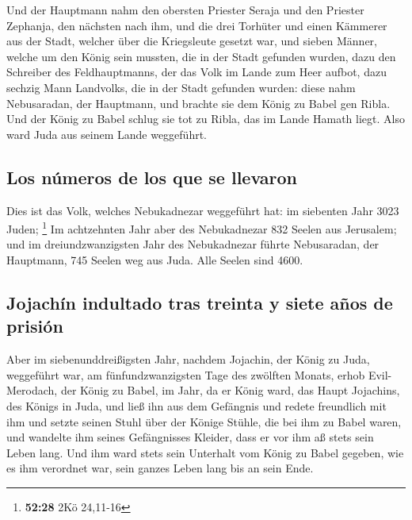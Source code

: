  Und der Hauptmann nahm den obersten Priester Seraja und
den Priester Zephanja, den nächsten nach ihm, und die drei Torhüter
 und einen Kämmerer aus der Stadt, welcher über die
Kriegsleute gesetzt war, und sieben Männer, welche um den König sein
mussten, die in der Stadt gefunden wurden, dazu den Schreiber des
Feldhauptmanns, der das Volk im Lande zum Heer aufbot, dazu sechzig Mann
Landvolks, die in der Stadt gefunden wurden:  diese nahm
Nebusaradan, der Hauptmann, und brachte sie dem König zu Babel gen
Ribla.  Und der König zu Babel schlug sie tot zu Ribla,
das im Lande Hamath liegt. Also ward Juda aus seinem Lande weggeführt.

\hypertarget{los-nuxfameros-de-los-que-se-llevaron}{%
\subsection{Los números de los que se
llevaron}\label{los-nuxfameros-de-los-que-se-llevaron}}

 Dies ist das Volk, welches Nebukadnezar weggeführt hat:
im siebenten Jahr 3023 Juden; \footnote{\textbf{52:28} 2Kö 24,11-16}
 Im achtzehnten Jahr aber des Nebukadnezar 832 Seelen aus
Jerusalem;  und im dreiundzwanzigsten Jahr des
Nebukadnezar führte Nebusaradan, der Hauptmann, 745 Seelen weg aus Juda.
Alle Seelen sind 4600.

\hypertarget{jojachuxedn-indultado-tras-treinta-y-siete-auxf1os-de-prisiuxf3n}{%
\subsection{Jojachín indultado tras treinta y siete años de
prisión}\label{jojachuxedn-indultado-tras-treinta-y-siete-auxf1os-de-prisiuxf3n}}

 Aber im siebenunddreißigsten Jahr, nachdem Jojachin, der
König zu Juda, weggeführt war, am fünfundzwanzigsten Tage des zwölften
Monats, erhob Evil-Merodach, der König zu Babel, im Jahr, da er König
ward, das Haupt Jojachins, des Königs in Juda, und ließ ihn aus dem
Gefängnis  und redete freundlich mit ihm und setzte
seinen Stuhl über der Könige Stühle, die bei ihm zu Babel waren,
 und wandelte ihm seines Gefängnisses Kleider, dass er
vor ihm aß stets sein Leben lang.  Und ihm ward stets
sein Unterhalt vom König zu Babel gegeben, wie es ihm verordnet war,
sein ganzes Leben lang bis an sein Ende.
